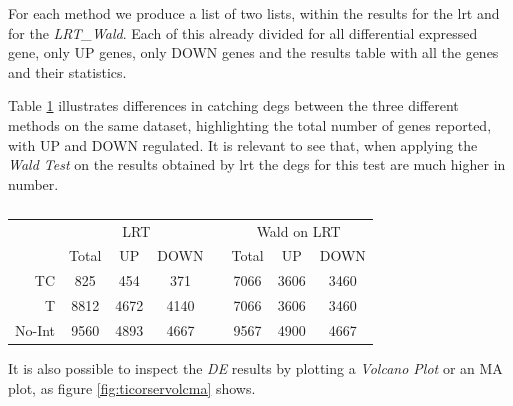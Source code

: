 For each method we produce a list of two lists, within the results for the \gls{lrt} and for the \textit{LRT\_Wald}. Each of this already divided for all differential expressed gene, only UP genes, only DOWN genes and the results table with all the genes and their statistics.

Table \ref{tab:ticorserderesults} illustrates differences in catching \glspl{deg} between the three different methods on the same dataset, highlighting the total number of genes reported, with UP and DOWN regulated. 
It is relevant to see that, when applying the \textit{Wald Test} on the results obtained by \gls{lrt} the \glspl{deg} for this test are much higher in number.

\begin{table}[H]
\centering
\begin{tabular}{r c c c c c c c}
\multicolumn{1}{r}{} & \multicolumn{3}{c}{LRT} && \multicolumn{3}{c}{Wald on LRT} \\
\multicolumn{1}{r}{} & Total & UP & DOWN && Total & UP & DOWN \\
\cline{2-4}\cline{6-8}
TC & 825 & 454 & 371 && 7066 & 3606 & 3460 \\
T & 8812 & 4672 & 4140 && 7066 & 3606 & 3460 \\
No-Int & 9560 & 4893 & 4667 && 9567 & 4900 & 4667 \\
\end{tabular}
\caption[\gls{tic} DE methods results]{}
\label{tab:ticorserderesults}
\end{table}


It is also possible to inspect the \textit{DE} results by plotting a \textit{Volcano Plot} or an MA plot, as figure \ref{fig:ticorservolcma} shows.

